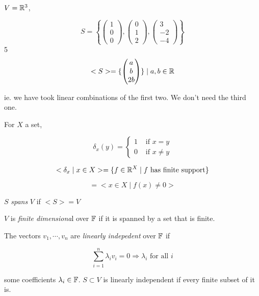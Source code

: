 \documentclass[a4paper]{article}
\begin{document}
\begin{eg}
	$ V = \mathbb{R}^{3} $, 
	
	\[ S = \left\{ \begin{pmatrix}
	1 \\
	0 \\
	0
	
	\end{pmatrix}, \begin{pmatrix}
	0\\
	1\\
	2
	
	\end{pmatrix}, \begin{pmatrix}
	3\\
	-2\\
	-4
	\end{pmatrix} \right\}  \]
	5
	\[ <S> = \{ \begin{pmatrix}
	a\\
	b\\
	2b
	\end{pmatrix} \} \; | \; a,b \in \mathbb{R} \]
	
	ie. we have took linear combinations of the first two. We don't need the third one.
	
\end{eg}



\begin{eg}
	For $ X $ a set, 
	
	
	\[ \delta_{x}(y) = \begin{cases} 1  & \text{ if } x = y \\ 0  & \text{ if } x \neq y \end{cases}  \]
	
	\[ < \delta_{x} \; | \; x \in X > = \{  f \in \mathbb{R}^{X} \; | \; f \text{ has finite support} \}  \]
	
	\[ = <  x \in X \; | \; f(x) \neq 0 > \]
\end{eg}

\begin{defi}
	$ S $ \emph{spans} $ V $ if $ <S> = V $
\end{defi}

\begin{defi}
	$ V $ is \emph{finite dimensiona}l over $ \mathbb{F} $ if it is spanned by a set that is finite.
\end{defi}

\begin{defi}
	The vectors $ v_{1},\cdots,v_{n} $ are \emph{linearly indepedent} over $ \mathbb{F} $ if 
	
	\[ \sum_{i = 1}^{n} \lambda_{i} v_{i} = 0 \Rightarrow \lambda_{i} \text{ for all } i \]
	
	some coefficients $ \lambda_{i} \in \mathbb{F}  $. $ S \subset V $ is linearly independent if every finite subset of it is. 
\end{defi}
\end{document}
